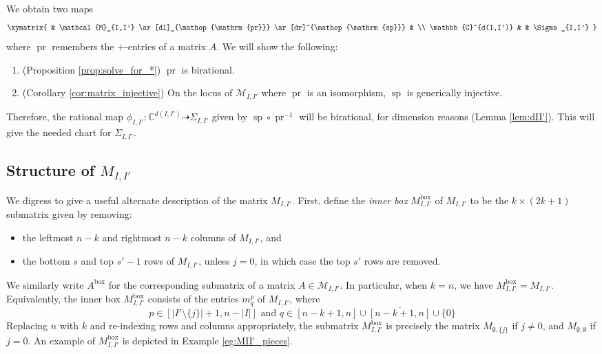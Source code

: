 \documentclass[12pt]{amsart}
\DeclareMathOperator{\inbox}{box}
\DeclareMathOperator{\pr}{pr}
\DeclareMathOperator{\ssp}{sp}
\newcommand{\bC}{\mathbb{C}}
\newcommand{\cM}{\mathcal{M}}
\begin{document}
We obtain two maps
\begin{equation*}
    \xymatrix{
    & \cM_{I,I'} \ar[dl]_{\pr} \ar[dr]^{\ssp} & \\
    \bC^{d(I,I')} & & \Sigma_{I,I'}
    }
\end{equation*}
where $\pr$ remembers the $+$-entries of a matrix $A$. We will show the following:
\begin{enumerate}
    \item[(1)] (Proposition \ref{prop:solve_for_*}) $\pr$ is birational.
    \item[(2)] (Corollary \ref{cor:matrix_injective}) On the locus of $\cM_{I,I'}$ where $\pr$ is an isomorphism, $\ssp$ is generically injective.
\end{enumerate}

Therefore, the rational map $\phi_{I,I'}:\bC^{d(I,I')}\dashrightarrow \Sigma_{I,I'}$ given by $\ssp\circ\pr^{-1}$ will be birational, for dimension reasons (Lemma \ref{lem:dII'}). This will give the needed chart for $\Sigma_{I,I'}$.

\subsection{Structure of $M_{I,I'}$}\label{sec:M_II'_structure}

We digress to give a useful alternate description of the matrix $M_{I,I'}$. First, define the \emph{inner box} $M^{\inbox}_{I,I'}$ of $M_{I,I'}$ to be the $k \times (2k+1)$ submatrix given by removing:
\begin{itemize}
    \item the leftmost $n-k$ and rightmost $n-k$ columns of $M_{I,I'}$, and
    \item the bottom $s$ and top $s'-1$ rows of $M_{I,I'}$, unless $j=0$, in which case the top $s'$ rows are removed.
\end{itemize}
We similarly write $A^{\inbox}$ for the corresponding submatrix of a matrix $A\in\cM_{I,I'}$. In particular, when $k=n$, we have $M^{\inbox}_{I,I'}=M_{I,I'}$. Equivalently, the inner box $M^{\inbox}_{I,I'}$ consists of the entries $m^p_q$ of $M_{I,I'}$, where 
\begin{equation*}
    p \in [|I' \setminus\{j\}| +1, n-|I|]\text{ and }q \in [n-k+1, n] \cup \overline{[n-k+1, n]} \cup \{0\}
\end{equation*}
Replacing $n$ with $k$ and re-indexing rows and columns appropriately, the submatrix $M^{\inbox}_{I,I'}$ is precisely the matrix $M_{\emptyset, \{j\}}$ if $j\neq 0$, and $M_{\emptyset, \emptyset}$ if $j=0$. An example of $M^{\inbox}_{I,I'}$ is depicted in Example \ref{eg:MII'_pieces}.
\end{document}
